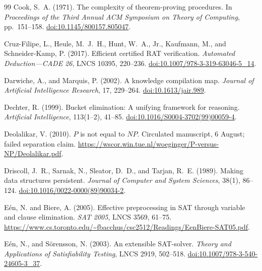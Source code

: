 \documentclass[11pt,a4paper]{article}
\numberwithin{equation}{section}
\theoremstyle{plain}
\theoremstyle{definition}
\theoremstyle{remark}
\begin{document}
\begin{thebibliography}{99}
Cook, S.~A. (1971).
The complexity of theorem-proving procedures.
In \emph{Proceedings of the Third Annual ACM Symposium on Theory of Computing}, pp.~151--158.
\href{https://doi.org/10.1145/800157.805047}{doi:10.1145/800157.805047}.

Cruz-Filipe, L., Heule, M.~J.~H., Hunt, W.~A., Jr., Kaufmann, M., and Schneider-Kamp, P. (2017).
Efficient certified RAT verification.
\emph{Automated Deduction---CADE 26}, LNCS 10395, 220--236.
\href{https://doi.org/10.1007/978-3-319-63046-5_14}{doi:10.1007/978-3-319-63046-5\_14}.

Darwiche, A., and Marquis, P. (2002).
A knowledge compilation map.
\emph{Journal of Artificial Intelligence Research}, 17, 229--264.
\href{https://doi.org/10.1613/jair.989}{doi:10.1613/jair.989}.

Dechter, R. (1999).
Bucket elimination: A unifying framework for reasoning.
\emph{Artificial Intelligence}, 113(1--2), 41--85.
\href{https://doi.org/10.1016/S0004-3702(99)00059-4}{doi:10.1016/S0004-3702(99)00059-4}.

Deolalikar, V. (2010).
$P$ is not equal to $NP$.
Circulated manuscript, 6 August; failed separation claim.
\url{https://wscor.win.tue.nl/woeginger/P-versus-NP/Deolalikar.pdf}.

Driscoll, J.~R., Sarnak, N., Sleator, D.~D., and Tarjan, R.~E. (1989).
Making data structures persistent.
\emph{Journal of Computer and System Sciences}, 38(1), 86--124.
\href{https://doi.org/10.1016/0022-0000(89)90034-2}{doi:10.1016/0022-0000(89)90034-2}.

E\'en, N. and Biere, A. (2005).
Effective preprocessing in SAT through variable and clause elimination.
\emph{SAT 2005}, LNCS 3569, 61--75.
\url{https://www.cs.toronto.edu/~fbacchus/csc2512/Readings/EenBiere-SAT05.pdf}.

E\'en, N., and S\"orensson, N. (2003).
An extensible SAT-solver.
\emph{Theory and Applications of Satisfiability Testing}, LNCS 2919, 502--518.
\href{https://doi.org/10.1007/978-3-540-24605-3_37}{doi:10.1007/978-3-540-24605-3\_37}.


\end{thebibliography}
\end{document}
